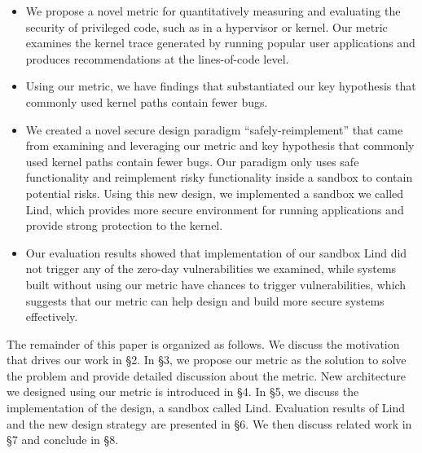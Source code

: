 \begin{itemize}
\item We propose a novel metric for quantitatively measuring and evaluating 
the security of privileged code, such as in a hypervisor or kernel. 
Our metric examines the kernel trace generated by running popular user 
applications and produces recommendations at the lines-of-code level.  

\item Using our metric, we have findings that substantiated our key hypothesis that commonly used kernel paths 
contain fewer bugs.  

\item We created a novel secure design paradigm ``safely-reimplement'' that 
came from examining and leveraging our metric and key hypothesis 
that commonly used kernel paths contain fewer bugs.   
Our paradigm only uses safe functionality and reimplement risky functionality inside a sandbox to contain potential risks. 
Using this new design, we implemented a sandbox we called Lind, which provides more secure environment
for running applications and provide strong protection to the kernel. 

\item Our evaluation results showed that implementation of our sandbox Lind did not trigger any of the 
zero-day vulnerabilities we examined, 
while systems built without using our metric have chances to trigger
vulnerabilities, which suggests 
that our metric can help design and build more secure systems effectively.
\end{itemize}

The remainder of this paper is organized as follows. 
We discuss the motivation that drives our work in \S{2}. 
In \S{3}, we propose our metric as the solution to solve the problem and provide detailed discussion about the metric.
New architecture we designed using our metric is introduced in \S{4}. In \S{5}, we discuss the implementation of the design, a sandbox called Lind. 
Evaluation results of Lind and the new design strategy are presented in \S{6}. 
We then discuss related work in \S{7} and conclude in \S{8}. 
